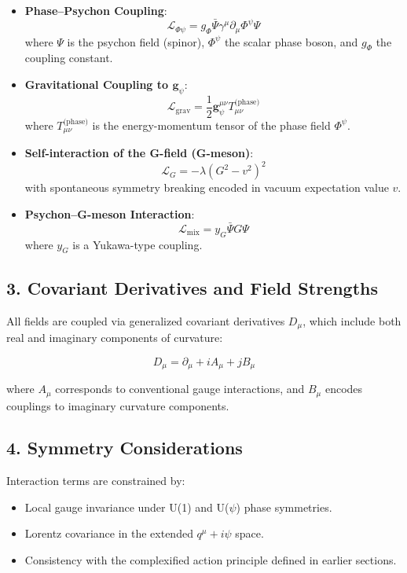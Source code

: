 \begin{itemize}
  \item \textbf{Phase–Psychon Coupling}:
  \[
  \mathcal{L}_{\Phi\psi} = g_\Phi \bar{\Psi} \gamma^\mu \partial_\mu \Phi^\psi \Psi
  \]
  where $\Psi$ is the psychon field (spinor), $\Phi^\psi$ the scalar phase boson, and $g_\Phi$ the coupling constant.

  \item \textbf{Gravitational Coupling to $\mathbf{g}_\psi$}:
  \[
  \mathcal{L}_{\text{grav}} = \frac{1}{2} \mathbf{g}_\psi^{\mu\nu} T_{\mu\nu}^{\text{(phase)}}
  \]
  where $T_{\mu\nu}^{\text{(phase)}}$ is the energy-momentum tensor of the phase field $\Phi^\psi$.

  \item \textbf{Self-interaction of the G-field (G-meson)}:
  \[
  \mathcal{L}_G = -\lambda (G^2 - v^2)^2
  \]
  with spontaneous symmetry breaking encoded in vacuum expectation value $v$.

  \item \textbf{Psychon–G-meson Interaction}:
  \[
  \mathcal{L}_{\text{mix}} = y_G \bar{\Psi} G \Psi
  \]
  where $y_G$ is a Yukawa-type coupling.
\end{itemize}

\subsection*{3. Covariant Derivatives and Field Strengths}

All fields are coupled via generalized covariant derivatives $D_\mu$, which include both real and imaginary components of curvature:

\[
D_\mu = \partial_\mu + i A_\mu + j B_\mu
\]

where $A_\mu$ corresponds to conventional gauge interactions, and $B_\mu$ encodes couplings to imaginary curvature components.

\subsection*{4. Symmetry Considerations}

Interaction terms are constrained by:
\begin{itemize}
  \item Local gauge invariance under U(1) and U($\psi$) phase symmetries.
  \item Lorentz covariance in the extended $q^\mu + i \psi$ space.
  \item Consistency with the complexified action principle defined in earlier sections.
\end{itemize}

